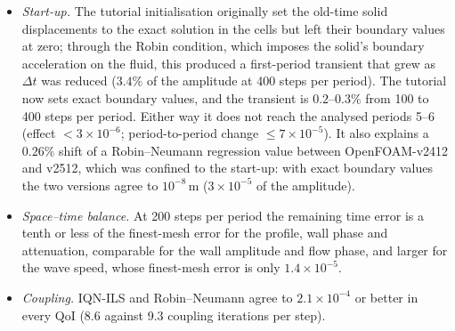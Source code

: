 \begin{itemize}
boundary) and did not converge robustly. (At such fine fixed-mesh time steps, the default flux-ratio coefficient of OpenFOAM's Rhie--Chow \texttt{ddtCorr} term also limits convergence, at $\approx10^{-6}$.)
	\item \emph{Start-up.} The tutorial initialisation originally set the old-time solid displacements to the exact solution in the cells but left their boundary values at zero; through the Robin condition, which imposes the solid's boundary acceleration on the fluid, this produced a first-period transient that grew as $\Delta t$ was reduced ($3.4\%$ of the amplitude at 400 steps per period). The tutorial now sets exact boundary values, and the transient is $0.2$--$0.3\%$ from 100 to 400 steps per period. Either way it does not reach the analysed periods 5--6 (effect $<3\times10^{-6}$; period-to-period change $\leq7\times10^{-5}$). It also explains a $0.26\%$ shift of a Robin--Neumann regression value between OpenFOAM-v2412 and v2512, which was confined to the start-up: with exact boundary values the two versions agree to $10^{-8}\,\mathrm{m}$ ($3\times10^{-5}$ of the amplitude).
	\item \emph{Space--time balance.} At 200 steps per period the remaining time error is a tenth or less of the finest-mesh error for the profile, wall phase and attenuation, comparable for the wall amplitude and flow phase, and larger for the wave speed, whose finest-mesh error is only $1.4\times10^{-5}$.
	\item \emph{Coupling.} IQN-ILS and Robin--Neumann agree to $2.1\times10^{-4}$ or better in every QoI (8.6 against 9.3 coupling iterations per step).
\end{itemize}


